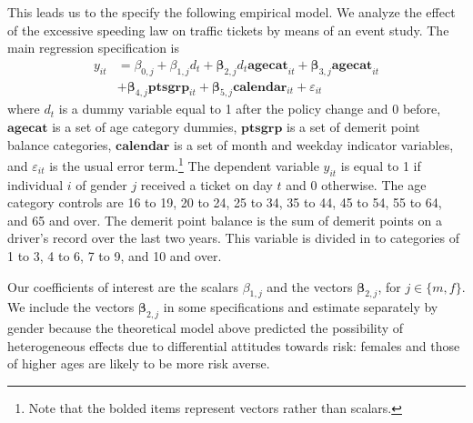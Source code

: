 This leads us to the specify the following empirical model.
% 
We analyze the effect of the excessive speeding law on traffic tickets 
by means of an event study. 
The main regression specification is
%
\begin{align*}
y_{it} & 	= \beta_{0,j} + \beta_{1,j} d_t
      		+ \bm{\beta}_{2,j} d_t \bm{agecat}_{it} 
	 		+ \bm{\beta}_{3,j} \mathbf{agecat}_{it} \\
         &	+ \bm{\beta}_{4,j} \bm{ptsgrp}_{it}
      		+ \bm{\beta}_{5,j} \bm{calendar}_{it}
      		+ \varepsilon_{it}
\end{align*}
%
where $d_t$ is a dummy variable equal to 
1 after the policy change and 0 before, 
$\mathbf{agecat}$ is a set of age category dummies, 
$\mathbf{ptsgrp}$ is a set of demerit point balance categories, 
$\mathbf{calendar}$ is a set of month and weekday indicator variables, 
and $\varepsilon_{it}$ is the usual error term.\footnote{%
Note that the bolded items represent vectors rather than scalars.}
%  
The dependent variable $y_{it}$ is equal to 1 if individual $i$ 
of gender $j$ 
received a ticket on day $t$ and 0 otherwise. 
The age category controls are 
16 to 19, 20 to 24, 25 to 34, 35 to 44, 45 to 54, 55 to 64, and 65 and over. 
The demerit point balance is the sum of demerit points 
on a driver’s record over the last two years. 
This variable is divided in to categories of 1 to 3, 4 to 6, 7 to 9, and 10 and over.


Our coefficients of interest are 
the scalars $\beta_{1,j}$ and the vectors $\bm{\beta}_{2,j}$, 
for $j \in \{ m, f\}$. 
We include the vectors $\bm{\beta}_{2,j}$ in some specifications 
and estimate separately by gender because the theoretical model 
above predicted the possibility of heterogeneous effects 
due to differential attitudes towards risk: 
females and those of higher ages are likely to be more risk averse. 





